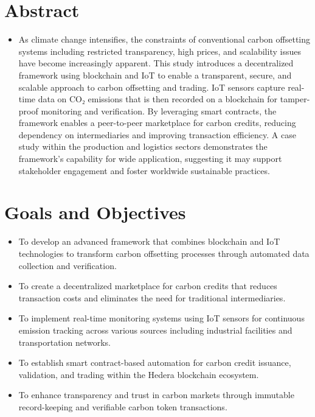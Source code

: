\documentclass[oneside,a4paper,12pt]{book}
\begin{document}
\section{Abstract}
\begin{itemize}
	\item As climate change intensifies, the constraints of conventional carbon offsetting systems including restricted transparency, high prices, and scalability issues have become increasingly apparent. This study introduces a decentralized framework using blockchain and IoT to enable a transparent, secure, and scalable approach to carbon offsetting and trading. IoT sensors capture real-time data on CO₂ emissions that is then recorded on a blockchain for tamper-proof monitoring and verification. By leveraging smart contracts, the framework enables a peer-to-peer marketplace for carbon credits, reducing dependency on intermediaries and improving transaction efficiency. A case study within the production and logistics sectors demonstrates the framework's capability for wide application, suggesting it may support stakeholder engagement and foster worldwide sustainable practices.
\end{itemize}

\section{Goals and Objectives}
\begin{itemize}
    \item To develop an advanced framework that combines blockchain and IoT technologies to transform carbon offsetting processes through automated data collection and verification.
    \item To create a decentralized marketplace for carbon credits that reduces transaction costs and eliminates the need for traditional intermediaries.
    \item To implement real-time monitoring systems using IoT sensors for continuous emission tracking across various sources including industrial facilities and transportation networks.
    \item To establish smart contract-based automation for carbon credit issuance, validation, and trading within the Hedera blockchain ecosystem.
    \item To enhance transparency and trust in carbon markets through immutable record-keeping and verifiable carbon token transactions.
\end{itemize}
\end{document}
